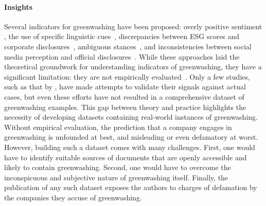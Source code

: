 


\paragraph{Insights} Several indicators for greenwashing have been proposed: 
overly positive sentiment \cite{hyewon_kang_analyzing_2022}, the use of specific linguistic cues~\cite{divinus_oppong-tawiah_corporate_2023}, discrepancies between ESG scores and corporate disclosures~\cite{LEE_greenwashing, Greenscreen}, ambiguous stances~\cite{morio2023an}, and inconsistencies between social media perception and official disclosures~\cite{kdir23}.
While these approaches laid the theoretical groundwork for understanding indicators of greenwashing, they have a significant limitation: they are not empirically evaluated~\cite{measuring_greenwashing}. %
Only a few studies, such as that by \citet{hyewon_kang_analyzing_2022}, have made attempts to validate their signals against actual cases, but even these efforts have not resulted in a comprehensive dataset of greenwashing examples.
This gap between theory and practice highlights the necessity of developing datasets containing real-world instances of greenwashing. Without empirical evaluation, the prediction that a company engages in greenwashing is unfounded at best, and misleading or even defamatory at worst. %
However, building such a dataset comes with many challenges. First, one would have to identify suitable sources of documents that are openly accessible and likely to contain greenwashing. Second, one would have to overcome the inconspicuous and subjective nature of greenwashing itself. Finally, the publication of any such dataset exposes the authors to charges of defamation by the companies they accuse of greenwashing.
